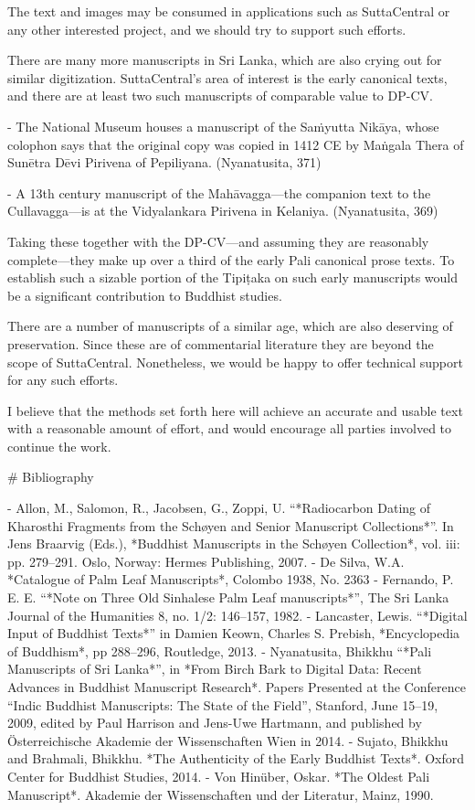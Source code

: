 \documentclass[11pt, openany,a5paper]{article}
\begin{document}
\begin{markdown}
The text and images may be consumed in applications such as SuttaCentral or any other interested project, and we should try to support such efforts.

There are many more manuscripts in Sri Lanka, which are also crying out for similar digitization. SuttaCentral’s area of interest is the early canonical texts, and there are at least two such manuscripts of comparable value to DP-CV.

- The National Museum houses a manuscript of the Saṁyutta Nikāya, whose colophon says that the original copy was copied in 1412 CE by Maṅgala Thera of Sunētra Dēvi Pirivena of Pepiliyana. (Nyanatusita, 371)

- A 13th century manuscript of the Mahāvagga—the companion text to the Cullavagga—is at the Vidyalankara Pirivena in Kelaniya. (Nyanatusita, 369)

Taking these together with the DP-CV—and assuming they are reasonably complete—they make up over a third of the early Pali canonical prose texts. To establish such a sizable portion of the Tipiṭaka on such early manuscripts would be a significant contribution to Buddhist studies.

There are a number of manuscripts of a similar age, which are also deserving of preservation. Since these are of commentarial literature they are beyond the scope of SuttaCentral. Nonetheless, we would be happy to offer technical support for any such efforts.

I believe that the methods set forth here will achieve an accurate and usable text with a reasonable amount of effort, and would encourage all parties involved to continue the work.

# Bibliography

- Allon, M., Salomon, R., Jacobsen, G., Zoppi, U. “*Radiocarbon Dating of Kharosthi Fragments from the Schøyen and Senior Manuscript Collections*”. In Jens Braarvig (Eds.), *Buddhist Manuscripts in the Schøyen Collection*, vol. iii: pp. 279–291. Oslo, Norway: Hermes Publishing, 2007.
- De Silva, W.A. *Catalogue of Palm Leaf Manuscripts*, Colombo 1938, No. 2363
- Fernando, P. E. E. “*Note on Three Old Sinhalese Palm Leaf manuscripts*”, The Sri Lanka Journal of the Humanities 8, no. 1/2: 146–157, 1982.
- Lancaster, Lewis. “*Digital Input of Buddhist Texts*” in Damien Keown, Charles S. Prebish, *Encyclopedia of Buddhism*, pp 288–296, Routledge, 2013.
- Nyanatusita, Bhikkhu “*Pali Manuscripts of Sri Lanka*”, in *From Birch Bark to Digital Data: Recent Advances in Buddhist Manuscript Research*. Papers Presented at the Conference “Indic Buddhist Manuscripts: The State of the Field”, Stanford, June 15–19, 2009, edited by Paul Harrison and Jens-Uwe Hartmann, and published by Österreichische Akademie der Wissenschaften Wien in 2014.
- Sujato, Bhikkhu and Brahmali, Bhikkhu. *The Authenticity of the Early Buddhist Texts*. Oxford Center for Buddhist Studies, 2014.
- Von Hinüber, Oskar. *The Oldest Pali Manuscript*. Akademie der Wissenschaften und der Literatur, Mainz, 1990.


\end{markdown}
\end{document}
